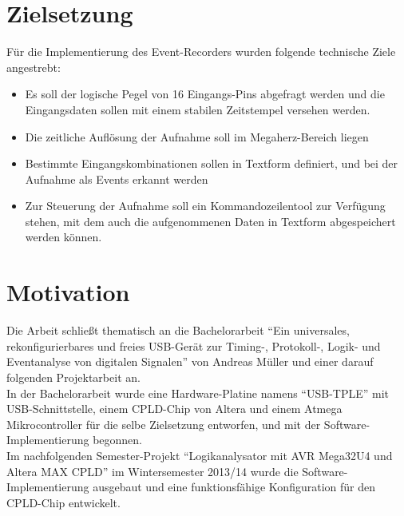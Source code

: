 \clearpage

\section{Zielsetzung}
\label{ch:Einfuehrung:Zielsetzung}

Für die Implementierung des Event-Recorders wurden folgende technische Ziele angestrebt:
\begin{itemize}
\item Es soll der logische Pegel von 16 Eingangs-Pins abgefragt werden und die Eingangsdaten sollen mit einem stabilen Zeitstempel versehen werden.
\item Die zeitliche Auflösung der Aufnahme soll im Megaherz-Bereich liegen
\item Bestimmte Eingangskombinationen sollen in Textform definiert, und bei der Aufnahme als Events erkannt werden
\item Zur Steuerung der Aufnahme soll ein Kommandozeilentool zur Verfügung stehen, mit dem auch die aufgenommenen Daten in Textform abgespeichert werden können.
\end{itemize} 


\section{Motivation}
\label{ch:Einfuehrung:Motivation}

Die Arbeit schließt thematisch an die Bachelorarbeit ``Ein universales, rekonfigurierbares und freies USB-Gerät zur Timing-, Protokoll-, Logik- und Eventanalyse von digitalen Signalen'' von Andreas Müller und einer darauf folgenden Projektarbeit an.\\
In der Bachelorarbeit wurde eine Hardware-Platine namens ``USB-TPLE'' mit USB-Schnittstelle, einem \acrshort{CPLD}-Chip von Altera und einem Atmega Mikrocontroller für die selbe Zielsetzung entworfen, und mit der Software-Implementierung begonnen\cite{ba:mueller}.\\  
Im nachfolgenden Semester-Projekt ``Logikanalysator mit AVR Mega32U4 und Altera MAX CPLD'' im Wintersemester 2013/14 wurde die Software-Implementierung ausgebaut und eine funktionsfähige Konfiguration für den CPLD-Chip entwickelt.\\

